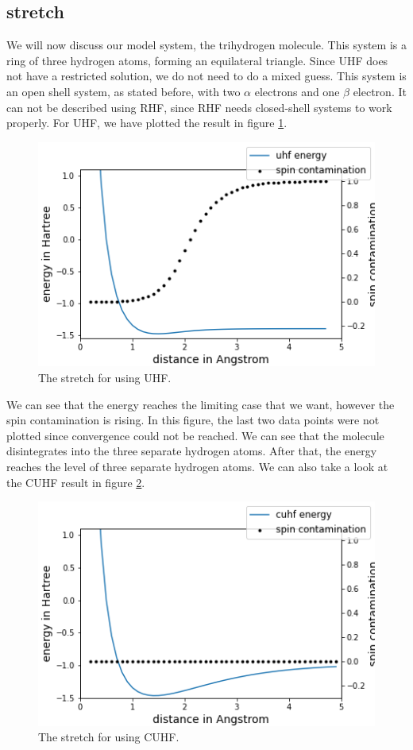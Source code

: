\subsection{ stretch}
\label{subsec:h3}
We will now discuss our model system, the trihydrogen molecule. This system is a ring of three hydrogen atoms, forming an equilateral triangle. Since UHF does not have a restricted solution, 
we do not need to do a mixed guess.
This system is an open shell system, as stated before, with two $\alpha$ electrons and one $\beta$ electron. It can not be described using RHF, since RHF needs closed-shell systems to work
properly. For UHF, we have plotted the result in figure \ref{fig:uhf_h3}.
\begin{center}
  \begin{figure}[H]
    \centering
    \includegraphics[width=0.5\linewidth]{./img/h3_uhf_sto-3g.png}
    \caption{The stretch for  using UHF.}
    \label{fig:uhf_h3}
  \end{figure}
\end{center}
We can see that the energy reaches the limiting case that we want, however the spin contamination is rising. In this figure, the last two data points were not plotted since convergence
could not be reached.  We can see that the molecule disintegrates into the three separate hydrogen atoms.
After that, the energy reaches the level of three separate hydrogen atoms. We can also take a look at the CUHF result in
figure \ref{fig:cuhf_h3}.
\begin{center}
  \begin{figure}[H]
    \centering
    \includegraphics[width=0.5\linewidth]{./img/h3_cuhf.png}
    \caption{The stretch for  using CUHF.}
    \label{fig:cuhf_h3}
  \end{figure}
\end{center}
